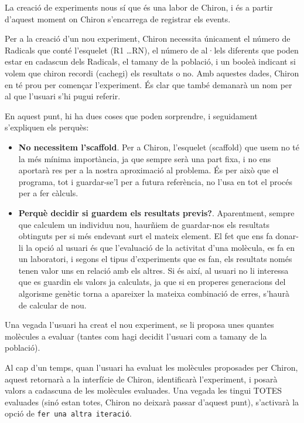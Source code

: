 \documentclass[titlepage,a4paper,12pt]{book}
\begin{document}
La creació de experiments nous sí que és una labor de Chiron, i és a partir
d'aquest moment on Chiron s'encarrega de registrar els events.

Per a la creació d'un nou experiment, Chiron necessita únicament el número de
Radicals que conté l'esquelet (R1 \dots RN), el número de al·lels diferents que
poden estar en cadascun dels Radicals, el tamany de la població, i un booleà
indicant si volem que chiron recordi (cachegi) els resultats o no.  Amb aquestes
dades, Chiron en té prou per començar l'experiment.  És clar que també demanarà
un nom per al que l'usuari s'hi pugui referir.

En aquest punt, hi ha dues coses que poden sorprendre, i seguidament s'expliquen
els perquès:

\begin{itemize}
	\item \textbf{No necessitem l'scaffold}. Per a Chiron, l'esquelet (scaffold)
	que usem no té la més mínima importància, ja que sempre serà una part fixa,
	i no ens aportarà res per a la nostra aproximació al problema.  És per això
	que el programa, tot i guardar-se'l per a futura referència, no l'usa en tot
	el procés per a fer càlculs.

	\item \textbf{Perquè decidir si guardem els resultats previs?}.
	Aparentment, sempre que calculem un individuu nou, haurñiem de guardar-nos
	els resultats obtinguts per si més endevant surt el mateix element.  El fet
	que ens fa donar-li la opció al usuari és que l'evaluació de la activitat
	d'una molècula, es fa en un laboratori, i segons el tipus d'experiments que
	es fan, els resultats només tenen valor uns en relació amb els altres.  Si
	és així, al usuari no li interessa que es guardin els valors ja calculats,
	ja que si en properes generacions del algorisme genètic torna a apareixer la
	mateixa combinació de erres, s'haurà de calcular de nou.
\end{itemize}

Una vegada l'usuari ha creat el nou experiment, se li proposa unes quantes
molècules a evaluar (tantes com hagi decidit l'usuari com a tamany de la
població).

Al cap d'un temps, quan l'usuari ha evaluat les molècules proposades per Chiron,
aquest retornarà a la interfície de Chiron, identificarà l'experiment, i posarà
valors a cadascuna de les molècules evaluades.  Una vegada les tingui TOTES
evaluades (sinó estan totes, Chiron no deixarà passar d'aquest punt), s'activarà
la opció de \texttt{fer una altra iteració}.  
\end{document}
